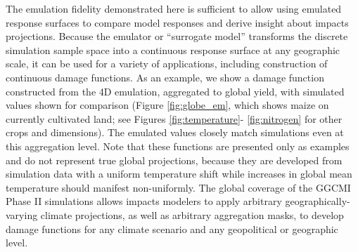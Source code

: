 \documentclass[preprint, 5p, times, twocolumn]{elsarticle}
\begin{document}
The emulation fidelity demonstrated here is sufficient to allow using emulated response surfaces to compare model responses and derive insight about impacts projections. Because the emulator or ``surrogate model'' transforms the discrete simulation sample space into a continuous response surface at any geographic scale, it can be used for a variety of applications, including construction of continuous damage functions. As an example, we show a damage function constructed from the 4D emulation, aggregated to global yield, with simulated values shown for comparison (Figure \ref{fig:globe_em}, which shows maize on currently cultivated land; see Figures \ref{fig:temperature}- \ref{fig:nitrogen} for other crops and dimensions). The emulated values closely match simulations even at this aggregation level. Note that these functions are presented only as examples and do not represent true global projections, because they are developed from simulation data with a uniform temperature shift while increases in global mean temperature should manifest non-uniformly. The global coverage of the GGCMI Phase II simulations allows impacts modelers to apply arbitrary geographically-varying climate projections, as well as arbitrary aggregation masks, to develop damage functions for any climate scenario and any geopolitical or geographic level.
\end{document}
